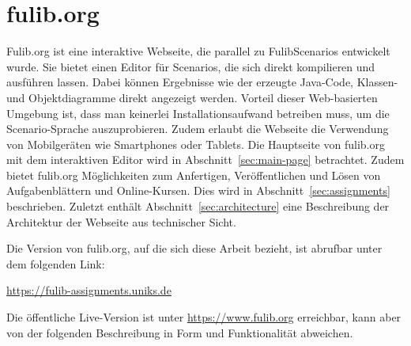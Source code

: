 \chapter{fulib.org}\label{ch:fulib.org}

Fulib.org ist eine interaktive Webseite, die parallel zu FulibScenarios entwickelt wurde.
Sie bietet einen Editor für Scenarios, die sich direkt kompilieren und ausführen lassen.
Dabei können Ergebnisse wie der erzeugte Java-Code, Klassen- und Objektdiagramme direkt angezeigt werden.
Vorteil dieser Web-basierten Umgebung ist, dass man keinerlei Installationsaufwand betreiben muss,
um die Scenario-Sprache auszuprobieren.
Zudem erlaubt die Webseite die Verwendung von Mobilgeräten wie Smartphones oder Tablets.
Die Hauptseite von fulib.org mit dem interaktiven Editor wird in Abschnitt~\ref{sec:main-page} betrachtet.
Zudem bietet fulib.org Möglichkeiten zum Anfertigen, Veröffentlichen und Lösen von Aufgabenblättern und Online-Kursen.
Dies wird in Abschnitt~\ref{sec:assignments} beschrieben.
Zuletzt enthält Abschnitt~\ref{sec:architecture} eine Beschreibung der Architektur der Webseite aus technischer Sicht.

Die Version von fulib.org, auf die sich diese Arbeit bezieht, ist abrufbar unter dem folgenden Link:

\begin{center}
    \url{https://fulib-assignments.uniks.de}
\end{center}

Die öffentliche Live-Version ist unter \url{https://www.fulib.org} erreichbar,
kann aber von der folgenden Beschreibung in Form und Funktionalität abweichen.





